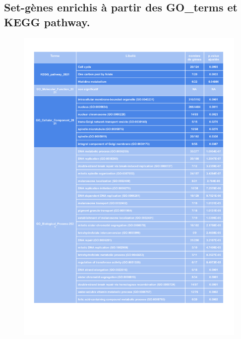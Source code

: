 \documentclass{style}
\begin{document}
\subsection{Set-gènes enrichis à partir des GO\_terms et KEGG pathway.}\label{appendix:set}
\begin{figure}[H]
    \centering
    \includegraphics[width=16cm]{images/figures/tab2.pdf}
\end{figure}
\end{document}
